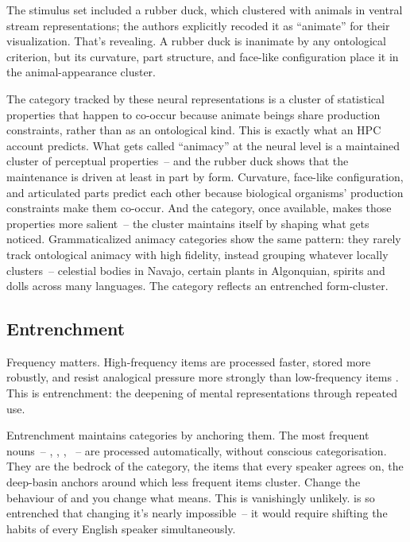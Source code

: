 The stimulus set included a rubber duck, which clustered with animals in ventral stream representations; the authors explicitly recoded it as \enquote{animate} for their visualization. That's revealing. A rubber duck is inanimate by any ontological criterion, but its curvature, part structure, and face-like configuration place it in the animal-appearance cluster.

The category tracked by these neural representations is a cluster of statistical properties that happen to co-occur because animate beings share production constraints, rather than  as an ontological kind. This is exactly what an HPC account predicts. What gets called \enquote{animacy} at the neural level is a maintained cluster of perceptual properties~-- and the rubber duck shows that the maintenance is driven at least in part by form. Curvature, face-like configuration, and articulated parts predict each other because biological organisms' production constraints make them co-occur. And the category, once available, makes those properties more salient~-- the cluster maintains itself by shaping what gets noticed. Grammaticalized animacy categories show the same pattern: they rarely track ontological animacy with high fidelity, instead grouping whatever locally clusters~-- celestial bodies in Navajo, certain plants in Algonquian, spirits and dolls across many languages. The category reflects an entrenched form-cluster.


\subsection{Entrenchment}
\label{subsec:4:entrenchment}

Frequency matters. High-frequency items are processed faster, stored more robustly, and resist analogical pressure more strongly than low-frequency items \citep{bybee2006,diessel2007}. This is entrenchment: the deepening of mental representations through repeated use.

Entrenchment maintains categories by anchoring them. The most frequent nouns~-- , , , ~-- are processed automatically, without conscious categorisation. They are the bedrock of the category, the items that every speaker agrees on, the deep-basin anchors around which less frequent items cluster. Change the behaviour of  and you change what  means. This is vanishingly unlikely.  is so entrenched that changing it's nearly impossible~-- it would require shifting the habits of every English speaker simultaneously.

